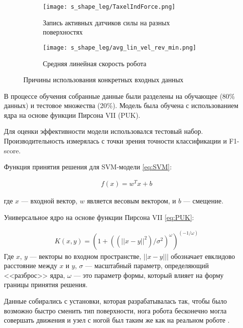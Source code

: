 \begin{figure}[ht!]
    \begin{subfigure}{0.99\textwidth}
        \centering\texttt{[image: s\_shape\_leg/TaxelIndForce.png]}
        \caption{Запись активных датчиков силы на разных поверхностях}
        \label{fig:s_shape_leg/TaxelIndForce_full.png}
    \end{subfigure}

    \begin{subfigure}{0.99\textwidth}
        \centering\texttt{[image: s\_shape\_leg/avg\_lin\_vel\_rev\_min.png]}
        \caption{Средняя линейная скорость робота}
        \label{fig:s_shape_leg/avg_lin_vel_rev_min.png}
    \end{subfigure}

\caption{Причины использования конкретных входных данных}
\end{figure}

В процессе обучения собранные данные были разделены на обучающее (80\% данных) и тестовое множества (20\%). Модель была обучена с использованием ядра на основе функции Пирсона VII (PUK). 

Для оценки эффективности модели использовался тестовый набор. Производительность измерялась с точки зрения точности классификации и F1-score.

Функция принятия решения для SVM-модели \eqref{eq:SVM}:

\begin{align}
    \label{eq:SVM}
    f(x) = w^T x + b
\end{align}

где $x$ --- входной вектор, $w$ является весовым вектором, и $b$ --- смещение.

Универсальное ядро на основе функции Пирсона VII \eqref{eq:PUK}:

\begin{align}
    \label{eq:PUK}
    K(x, y) = (1 + ((||x - y||^2)/\sigma^2)^\omega)^{(-1/\omega)}
\end{align}
Где $x$, $y$ --- векторы во входном пространстве, $||x - y|||$ обозначает евклидово расстояние между $x$ и $y$, $\sigma$ --- масштабный параметр, определяющий <<разброс>> ядра, $\omega$ --- это параметр формы, который влияет на форму границы принятия решения.

Данные собирались с установки, которая разрабатывалась так, чтобы было возможно быстро сменить тип поверхности, нога робота бесконечно могла совершать движения и узел с ногой был таким же как на реальном роботе .

